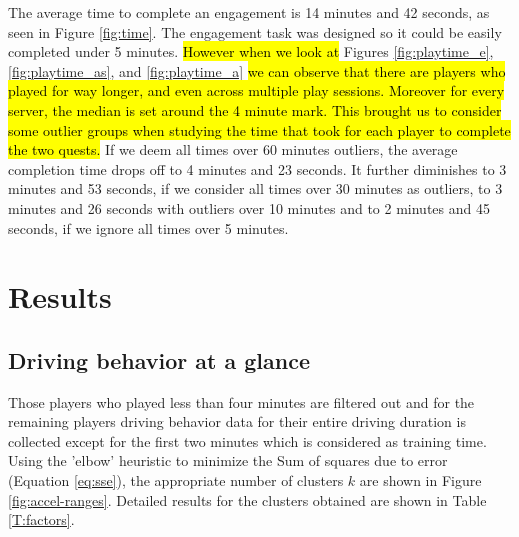 \documentclass[preprint,authoryear,12pt]{elsarticle}
\newcommand{\hlc}[2][yellow]{ {\sethlcolor{#1} \hl{#2}} }
\begin{document}
The average time to complete an engagement is 14 minutes and 42 seconds, as seen in Figure \ref{fig:time}. 
The engagement task was designed so it could be easily completed under 5 minutes. 
\hlc[green]{However when we look at} Figures \ref{fig:playtime_e}, \ref{fig:playtime_as}, and \ref{fig:playtime_a}
\hlc[green]{we can observe that there are players who played for way longer, and even across multiple play sessions. Moreover for every server, the median is set around the 4 minute mark. This brought us to consider some outlier groups when studying the time that took for each player to complete the two quests.}
If we deem all times over 60 minutes outliers, the average completion time drops off to 4 minutes and 23 seconds. It further diminishes to 3 minutes and 53 seconds, if we consider all times over 30 minutes as outliers, to 3 minutes and 26 seconds with outliers over 10 minutes and to 2 minutes and 45 seconds, if we ignore all times over 5 minutes.

\section{Results}
\label{subsec:result}

\subsection{Driving behavior at a glance}

Those players who played less than four minutes are filtered out and for the remaining players driving behavior data for their entire driving duration is collected except for the first two minutes which is considered as training time. 
Using the 'elbow' heuristic to minimize the Sum of squares due to error (Equation \ref{eq:sse}), the appropriate number of clusters $k$ are shown in Figure \ref{fig:accel-ranges}. Detailed results for the clusters obtained are shown in Table \ref{T:factors}. 
\end{document}

